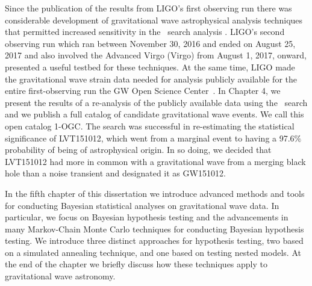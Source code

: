 Since the publication of the results from LIGO's first observing run there was considerable development of gravitational wave astrophysical analysis techniques that permitted increased sensitivity in the \pycbc{}\ search analysis \citep{Nitz:2017svb,Nitz:2017lco,DalCanton:2017ala}. LIGO's second observing run which ran between November 30, 2016 and ended on August 25, 2017 and also involved the Advanced Virgo (Virgo) from August 1, 2017, onward, presented a useful testbed for these techniques. At the same time, LIGO made the gravitational wave strain data needed for analysis publicly available for the entire first-observing run the GW Open Science Center~\citep{Vallisneri:2014vxa}. In Chapter 4, we present the results of a re-analysis of the publicly available data using the \pycbc{}\ search and we publish a full catalog of candidate gravitational wave events. We call this open catalog 1-OGC. The search was successful in re-estimating the statistical significance of LVT151012, which went from a marginal event to having a 97.6$\%$ probability of being of astrophysical origin. In so doing, we decided that LVT151012 had more in common with a gravitational wave from a merging black hole than a noise transient and designated it as GW151012.


In the fifth chapter of this dissertation we introduce advanced methods and tools for conducting Bayesian statistical analyses on gravitational wave data. In particular, we focus on Bayesian hypothesis testing and the advancements in many Markov-Chain Monte Carlo techniques for conducting Bayesian hypothesis testing. We introduce three distinct approaches for hypothesis testing, two based on a simulated annealing technique, and one based on testing nested models. At the end of the chapter we briefly discuss how these techniques apply to gravitational wave astronomy. 

